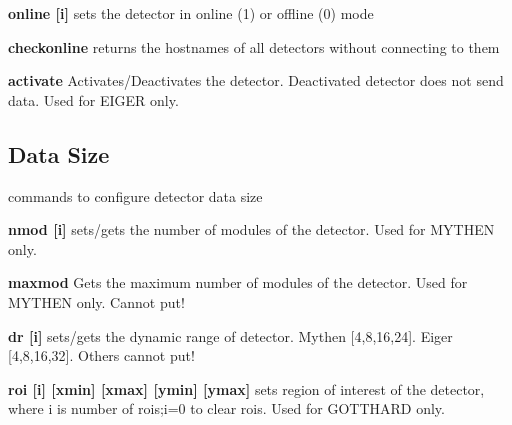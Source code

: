 \begin{DoxyItemize}
\item {\bfseries online \mbox{[}i\mbox{]}} sets the detector in online (1) or offline (0) mode
\end{DoxyItemize}


\begin{DoxyItemize}
\item {\bfseries checkonline} returns the hostnames of all detectors without connecting to them
\end{DoxyItemize}


\begin{DoxyItemize}
\item {\bfseries activate} Activates/Deactivates the detector. Deactivated detector does not send data. Used for EIGER only.
\end{DoxyItemize}\hypertarget{config_configsize}{}\subsection{Data Size}\label{config_configsize}
commands to configure detector data size


\begin{DoxyItemize}
\item {\bfseries nmod \mbox{[}i\mbox{]}} sets/gets the number of modules of the detector. Used for MYTHEN only.
\end{DoxyItemize}


\begin{DoxyItemize}
\item {\bfseries maxmod } Gets the maximum number of modules of the detector. Used for MYTHEN only. Cannot put!
\end{DoxyItemize}


\begin{DoxyItemize}
\item {\bfseries dr \mbox{[}i\mbox{]}} sets/gets the dynamic range of detector. Mythen \mbox{[}4,8,16,24\mbox{]}. Eiger \mbox{[}4,8,16,32\mbox{]}. Others cannot put!
\end{DoxyItemize}


\begin{DoxyItemize}
\item {\bfseries roi \mbox{[}i\mbox{]} \mbox{[}xmin\mbox{]} \mbox{[}xmax\mbox{]} \mbox{[}ymin\mbox{]} \mbox{[}ymax\mbox{]} } sets region of interest of the detector, where i is number of rois;i=0 to clear rois. Used for GOTTHARD only.
\end{DoxyItemize}



